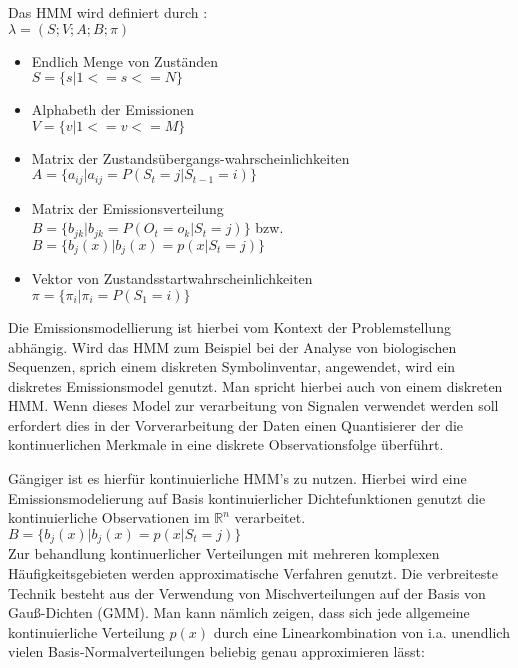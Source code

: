 Das \acl{HMM} wird definiert durch \cite[68]{mmmFink}:\\ 
\( \lambda = (S;V;A;B;\pi)\)
\begin{itemize}
     \item Endlich Menge von Zuständen \\
           \( S = \{ s | 1 <= s <= N \} \)
     \item Alphabeth der Emissionen \\
           \( V = \{ v | 1 <= v <= M \} \)
     \item Matrix der Zustandsübergangs-wahrscheinlichkeiten \\
           \( A = \{ a_{ij} | a_{ij} = P(S_t = j | S_{t-1} = i) \} \)
     \item Matrix der Emissionsverteilung \\
           \( B = \{ b_{jk} | b_{jk} = P(O_t = o_k | S_t = j) \} \) bzw. \( B =
           \{ b_{j}(x) | b_{j}(x) = p(x|S_t = j) \} \)
     \item Vektor von Zustandsstartwahrscheinlichkeiten \\
           \( \pi = \{ \pi_i | \pi_i = P(S_1 = i) \} \) 
\end{itemize}

Die Emissionsmodellierung ist hierbei vom Kontext der Problemstellung abhängig.
Wird das \acl{HMM} zum Beispiel bei der Analyse von biologischen Sequenzen,
sprich einem diskreten Symbolinventar, angewendet, wird ein diskretes
Emissionsmodel genutzt. Man spricht hierbei auch von einem diskreten \acl{HMM}.
Wenn dieses Model zur verarbeitung von Signalen verwendet werden soll erfordert
dies in der Vorverarbeitung der Daten einen Quantisierer der die
kontinuerlichen Merkmale in eine diskrete Observationsfolge überführt. 

Gängiger ist es hierfür kontinuierliche \acl{HMM}'s zu nutzen. Hierbei wird eine
Emissionsmodelierung auf Basis kontinuierlicher Dichtefunktionen genutzt die
kontinuierliche Observationen im \(\mathbb{R}^n\) verarbeitet.\\ 
\( B =\{ b_{j}(x) | b_{j}(x) = p(x|S_t = j) \} \)\\
Zur behandlung kontinuerlicher Verteilungen mit mehreren komplexen
Häufigkeitsgebieten werden approximatische Verfahren genutzt. Die verbreiteste
Technik besteht aus der Verwendung von Mischverteilungen auf der Basis von
Gauß-Dichten (\acl{GMM}). Man kann nämlich zeigen, dass sich jede allgemeine
kontinuierliche Verteilung \(p(x)\) durch eine Linearkombination von i.a. unendlich vielen
Basis-Normalverteilungen beliebig genau approximieren lässt\cite[69]{mmmFink}:
 
